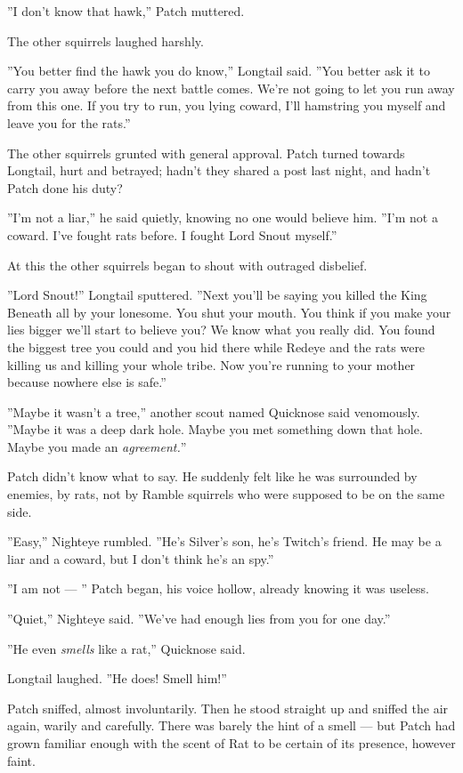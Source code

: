 \documentclass[12pt]{book}
\begin{document}
''I don't know that hawk,'' Patch muttered.

The other squirrels laughed harshly.

''You better find the hawk you do know,'' Longtail said. ''You better ask it to carry you away before the next battle comes. We're not going to let you run away from this one. If you try to run, you lying coward, I'll hamstring you myself and leave you for the rats.''

The other squirrels grunted with general approval. Patch turned towards Longtail, hurt and betrayed; hadn't they shared a post last night, and hadn't Patch done his duty?

''I'm not a liar,'' he said quietly, knowing no one would believe him. ''I'm not a coward. I've fought rats before. I fought Lord Snout myself.''

At this the other squirrels began to shout with outraged disbelief.

''Lord Snout!'' Longtail sputtered. ''Next you'll be saying you killed the King Beneath all by your lonesome. You shut your mouth. You think if you make your lies bigger we'll start to believe you? We know what you really did. You found the biggest tree you could and you hid there while Redeye and the rats were killing us and killing your whole tribe. Now you're running to your mother because nowhere else is safe.''

''Maybe it wasn't a tree,'' another scout named Quicknose said venomously. ''Maybe it was a deep dark hole. Maybe you met something down that hole. Maybe you made an {\it agreement.}''

Patch didn't know what to say. He suddenly felt like he was surrounded by enemies, by rats, not by Ramble squirrels who were supposed to be on the same side.

''Easy,'' Nighteye rumbled. ''He's Silver's son, he's Twitch's friend. He may be a liar and a coward, but I don't think he's an spy.''

''I am not ---
'' Patch began, his voice hollow, already knowing it was useless.

''Quiet,'' Nighteye said. ''We've had enough lies from you for one day.''

''He even {\it smells} like a rat,'' Quicknose said.

Longtail laughed. ''He does! Smell him!''

Patch sniffed, almost involuntarily. Then he stood straight up and sniffed the air again, warily and carefully. There was barely the hint of a smell ---
but Patch had grown familiar enough with the scent of Rat to be certain of its presence, however faint.
\end{document}
